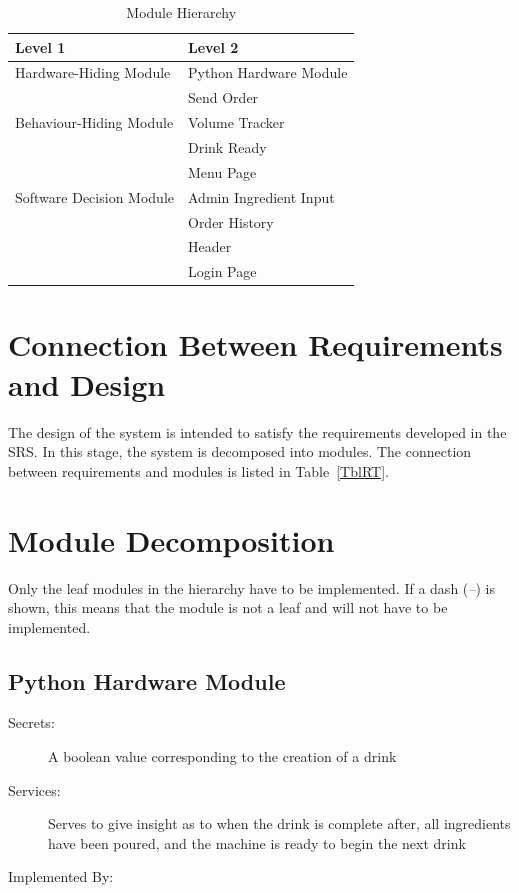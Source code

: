 \documentclass[12pt, titlepage]{article}
\begin{document}
\begin{table}[h!]
\centering
\begin{tabular}{p{} p{}}
\toprule
\textbf{Level 1} & \textbf{Level 2}\\
\midrule

{Hardware-Hiding Module} & Python Hardware Module \\
\midrule

\multirow{3}{0.3\textwidth}{Behaviour-Hiding Module}
& Send Order\\
& Volume Tracker\\
& Drink Ready\\
\midrule

\multirow{3}{0.3\textwidth}{Software Decision Module}
& Menu Page\\
& Admin Ingredient Input\\
& Order History\\
& Header\\
& Login Page\\
\bottomrule

\end{tabular}
\caption{Module Hierarchy}
\label{TblMH}
\end{table}

\section{Connection Between Requirements and Design} \label{SecConnection}

The design of the system is intended to satisfy the requirements developed in
the SRS. In this stage, the system is decomposed into modules. The connection
between requirements and modules is listed in Table~\ref{TblRT}.

\section{Module Decomposition} \label{SecMD}

Only the leaf modules in the hierarchy have to be implemented. If a dash
(\emph{--}) is shown, this means that the module is not a leaf and will not have
to be implemented.

\subsection{Python Hardware Module}
\begin{description}
\item[Secrets:]A boolean value corresponding to the creation of a drink
\item[Services:]Serves to give insight as to when the drink is complete after, all ingredients have been poured, and the machine is ready to begin the next drink
\item[Implemented By:]
\end{description}
\end{document}
